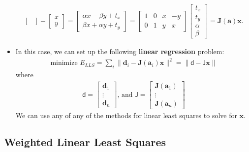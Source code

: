 \documentclass[10pt]{article}
\newcommand{\ve}[1]{\mathbf{#1}}
\newcommand{\msf}[1]{\mathsf{#1}}
\begin{document}
\begin{itemize}
\begin{align*}
\begin{bmatrix}
        \end{bmatrix} - 
        \begin{bmatrix} x \\ y \end{bmatrix}
	      = \begin{bmatrix} 
	          \alpha x - \beta y + t_x \\ 
	          \beta x + \alpha y  + t_y	          
          \end{bmatrix}
	      = \begin{bmatrix} 
	          1 & 0 & x & -y \\ 
	          0 & 1 & y & x 
	        \end{bmatrix}
	        \begin{bmatrix} 
	          t_x \\ t_y \\ \alpha \\ \beta 
	        \end{bmatrix}
	      = \ve{J}(\ve{a})\ve{x}.
	    \end{align*}
	    
	  \item In this case, we can set up the following {\bf linear regression} problem:
	    \begin{align*}
	      \mbox{minimize }E_{LLS} 
	      = \sum_{i} \| \ve{d}_i - \ve{J}(\ve{a}_i) \ve{x} \|^2
	      = \| \msf{d} - \msf{J} \ve{x} \|
	    \end{align*}
	    where
	    \begin{align*}
	      \msf{d} =\begin{bmatrix} \ve{d}_1 \\ \vdots \\ \ve{d}_n \end{bmatrix}
	      \mbox{, and }
	      \msf{J} 
	      = 
	      \begin{bmatrix} \ve{J}(\ve{a}_1) \\ \vdots \\ \ve{J}(\ve{a}_n) \end{bmatrix}
	    \end{align*}
	    We can use any of any of the methods for linear least squares to 
	    solve for $\ve{x}$.  	    	  	    
  \end{itemize}
  
  \subsection{Weighted Linear Least Squares}
\end{document}

